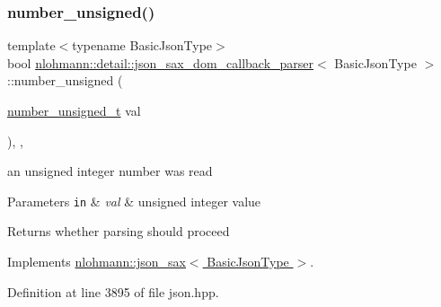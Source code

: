 \subsubsection{\texorpdfstring{number\+\_\+unsigned()}{number\_unsigned()}}
{\footnotesize\ttfamily template$<$typename Basic\+Json\+Type$>$ \\
bool \hyperlink{classnlohmann_1_1detail_1_1json__sax__dom__callback__parser}{nlohmann\+::detail\+::json\+\_\+sax\+\_\+dom\+\_\+callback\+\_\+parser}$<$ Basic\+Json\+Type $>$\+::number\+\_\+unsigned (\begin{DoxyParamCaption}\item[{\hyperlink{structnlohmann_1_1json__sax_a32028cc056ae0f43aaae331cdbbbf856}{number\+\_\+unsigned\+\_\+t}}]{val }\end{DoxyParamCaption})\hspace{0.3cm}{\ttfamily [inline]}, {\ttfamily [override]}, {\ttfamily [virtual]}}



an unsigned integer number was read 


\begin{DoxyParams}[1]{Parameters}
\mbox{\tt in}  & {\em val} & unsigned integer value \\
\hline
\end{DoxyParams}
\begin{DoxyReturn}{Returns}
whether parsing should proceed 
\end{DoxyReturn}


Implements \hyperlink{structnlohmann_1_1json__sax_ad9b253083e0509923ba195136f49face}{nlohmann\+::json\+\_\+sax$<$ Basic\+Json\+Type $>$}.



Definition at line 3895 of file json.\+hpp.

\mbox{\label{classnlohmann_1_1detail_1_1json__sax__dom__callback__parser_ad3a854f01133e12ec79139f3207e1720}} 
